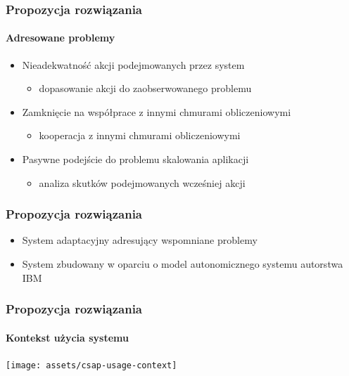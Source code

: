 \documentclass{beamer}
\begin{document}
\begin{frame}
\frametitle{Propozycja rozwiązania}
\framesubtitle{Adresowane problemy}

\begin{itemize}
\item Nieadekwatność akcji podejmowanych przez system
		\begin{itemize}
			\item dopasowanie akcji do zaobserwowanego problemu
		\end{itemize}

\item Zamknięcie na współprace z innymi chmurami obliczeniowymi
		\begin{itemize}
			\item kooperacja z innymi chmurami obliczeniowymi
		\end{itemize}

\item Pasywne podejście do problemu skalowania aplikacji 
		\begin{itemize}
			\item analiza skutków podejmowanych wcześniej akcji
		\end{itemize}		
\end{itemize}
\end{frame}




\begin{frame}
\frametitle{Propozycja rozwiązania}

\begin{itemize}
	\item System adaptacyjny adresujący wspomniane problemy
	\item System zbudowany w oparciu o model autonomicznego systemu autorstwa IBM
\end{itemize}


\end{frame}





\begin{frame}
\frametitle{Propozycja rozwiązania}
\framesubtitle{Kontekst użycia systemu}
\vspace{2 mm}
\begin{center}

\texttt{[image: assets/csap-usage-context]}
\end{center}

\end{frame}
\end{document}
